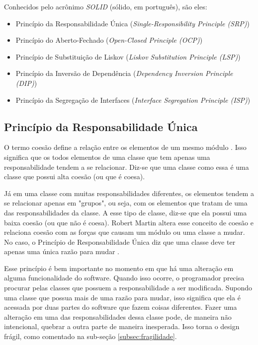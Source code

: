 Conhecidos pelo acrônimo \textit{SOLID} (sólido, em português), são eles:

\begin{itemize}
	\item Princípio da Responsabilidade Única (\textit{Single-Responsibility 
	Principle (SRP)})
	\item Princípio do Aberto-Fechado (\textit{Open-Closed Principle (OCP)})
	\item Princípio de Substituição de Liskov (\textit{Liskov Substitution 
	Principle (LSP)})
	\item Princípio da Inversão de Dependência (\textit{Dependency Inversion
	Principle (DIP)})
	\item Princípio da Segregação de Interfaces (\textit{Interface Segregation 
	Principle (ISP)})
\end{itemize}

\subsection{Princípio da Responsabilidade Única}
\label{subsec:principio-srp}

O termo coesão define a relação entre os elementos de um mesmo módulo
\cite{demarco} \cite{pagejones}. Isso significa que os todos elementos de uma 
classe que tem apenas uma responsabilidade tendem a se relacionar. Diz-se que
uma classe como essa é uma classe que possui alta coesão (ou que é coesa). 

Já em uma classe com muitas responsabilidades diferentes, os elementos tendem  a
se relacionar apenas em "grupos", ou seja, com os elementos que tratam de uma 
das responsabilidades da classe. A esse tipo de classe, diz-se que ela possui 
uma baixa coesão (ou que não é coesa).
Robert Martin altera esse conceito de coesão e relaciona coesão com as forças
que  causam um módulo ou uma classe a mudar. No caso, o Princípio de
Responsabilidade Única diz que uma classe deve ter apenas uma única razão para 
mudar \cite{bob-martin}.

Esse princípio é bem importante no momento em que há uma alteração em alguma 
funcionalidade do software. Quando isso ocorre, o programador precisa procurar 
pelas classes que possuem a responsabilidade a ser modificada. Supondo uma
classe  que possua mais de uma razão para mudar, isso significa que ela é
acessada  por duas partes do software que fazem coisas diferentes.  Fazer uma
alteração em uma das responsabilidades dessa classe pode, de maneira não
intencional, quebrar a outra parte de maneira inesperada. Isso torna o design
frágil, como comentado na sub-seção \ref{subsec:fragilidade}.


